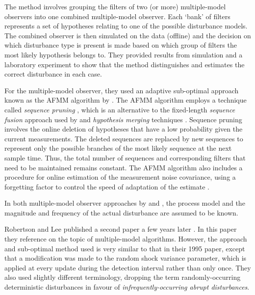 The method involves grouping the filters of two (or more) multiple-model observers into one combined multiple-model observer. Each `bank' of filters represents a set of hypotheses relating to one of the possible disturbance models. The combined observer is then simulated on the data (offline) and the decision on which disturbance type is present is made based on which group of filters the most likely hypothesis belongs to. They provided results from simulation and a laboratory experiment to show that the method distinguishes and estimates the correct disturbance in each case.

For the multiple-model observer, they used an adaptive sub-optimal approach known as the \gls{AFMM} algorithm by \cite{andersson_adaptive_1985}. The \gls{AFMM} algorithm employs a technique called \textit{sequence pruning} \citep{tugnait_detection_1982}, which is an alternative to the fixed-length \textit{sequence fusion} approach used by \cite{robertson_detection_1995} and \textit{hypothesis merging} techniques \citep{blom_interacting_1988}. Sequence pruning involves the online deletion of hypotheses that have a low probability given the current measurements. The deleted sequences are replaced by new sequences to represent only the possible branches of the most likely sequence at the next sample time. Thus, the total number of sequences and corresponding filters that need to be maintained remains constant. The \gls{AFMM} algorithm also includes a procedure for online estimation of the measurement noise covariance, using a forgetting factor to control the speed of adaptation of the estimate \citep{andersson_adaptive_1985}.

In both multiple-model observer approaches by \cite{eriksson_classification_1996} and \cite{robertson_detection_1995}, the process model and the magnitude and frequency of the actual disturbance are assumed to be known.

Robertson and Lee published a second paper a few years later \citep{robertson_method_1998}. In this paper they reference \cite{andersson_adaptive_1985} on the topic of multiple-model algorithms.  However, the approach and sub-optimal method used is very similar to that in their 1995 paper, except that a modification was made to the random shock variance parameter, which is applied at every update during the detection interval rather than only once. They also used slightly different terminology, dropping the term randomly-occurring deterministic disturbances in favour of \textit{infrequently-occurring abrupt disturbances}.

